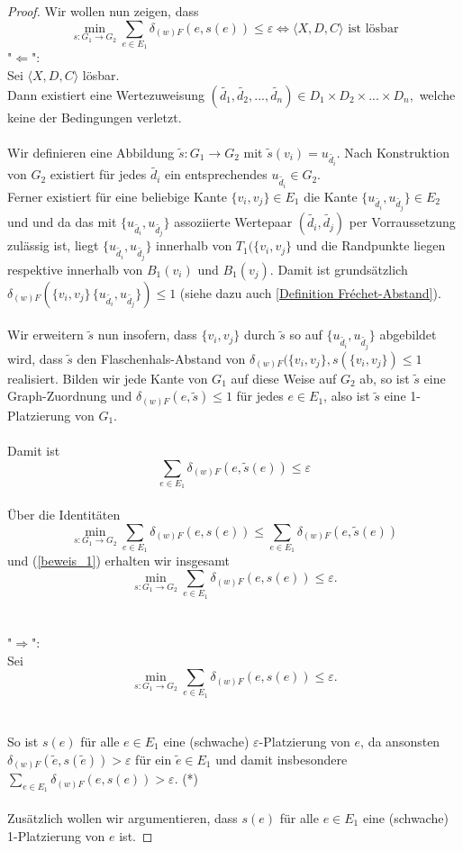 \documentclass[a4paper, 12pt, twoside]{article}
\theoremstyle{Format1} %
\begin{document}
\begin{proof}
Wir wollen nun zeigen, dass
$$ \min_{s: G_1 \to G_2} \sum_{e \in E_1} \delta_{(w)F}(e, s(e)) \leq \varepsilon \iff \langle X,D,C \rangle \text{ ist lösbar}$$
"$\Leftarrow$":
\\
Sei $\langle X,D,C \rangle$ lösbar.
\\
Dann existiert eine Wertezuweisung $(\tilde{d_1},\tilde{d_2},...,\tilde{d_n}) \in {D_1 \times D_2 \times ... \times D_n},$ welche keine der Bedingungen verletzt.
\\
\\
Wir definieren eine Abbildung $\tilde{s}:G_1 \to G_2$ mit $\tilde{s}(v_i) = u_{\tilde{d_i}}$.
Nach Konstruktion von $G_2$ existiert für jedes $\tilde{d_i}$ ein entsprechendes $u_{\tilde{d_i}} \in G_2$.
\\
Ferner existiert für eine beliebige Kante $\{v_i, v_j\} \in E_1$ die Kante $\{u_{\tilde{d_i}}, u_{\tilde{d_j}}\} \in E_2$ und
und da das mit $\{u_{\tilde{d_i}}, u_{\tilde{d_j}}\}$ assoziierte Wertepaar $(\tilde{d_i},\tilde{d_j})$ per Vorraussetzung zulässig ist,
liegt $\{u_{\tilde{d_i}}, u_{\tilde{d_j}}\}$ innerhalb von $T_1(\{v_i, v_j\}$ und die Randpunkte liegen respektive innerhalb von $B_1(v_i)$ und $B_1(v_j)$.
Damit ist grundsätzlich $\delta_{(w)F}(\{v_i, v_j\}\,\{u_{\tilde{d_i}}, u_{\tilde{d_j}}\}) \leq 1$ (siehe dazu auch \ref{Definition Fréchet-Abstand}).
\\
\\
Wir erweitern $\tilde{s}$ nun insofern, dass $\{v_i, v_j\}$ durch $\tilde{s}$ so auf $\{u_{\tilde{d_i}}, u_{\tilde{d_j}}\}$ abgebildet wird,
dass $\tilde{s}$ den Flaschenhals-Abstand von $\delta_{(w)F}(\{v_i, v_j\}, s(\{v_i, v_j\}) \leq 1$ realisiert.
Bilden wir jede Kante von $G_1$ auf diese Weise auf $G_2$ ab, so ist $\tilde{s}$ eine Graph-Zuordnung und $\delta_{(w)F}(e, \tilde{s}) \leq 1$ für jedes $e \in E_1$,
also ist $\tilde{s}$ eine 1-Platzierung von $G_1$.
\\
\\
Damit ist
\begin{equation} \label{beweis_1}
	\sum_{e \in E_1} \delta_{(w)F}(e, \tilde{s}(e)) \leq \varepsilon
\end{equation}
\\
Über die Identitäten $$\min_{s: G_1 \to G_2} \sum_{e \in E_1} \delta_{(w)F}(e, s(e)) \leq \sum_{e \in E_1} \delta_{(w)F}(e,\tilde{s}(e)) $$
und (\ref{beweis_1}) erhalten wir insgesamt
$$\min_{s: G_1 \to G_2} \sum_{e \in E_1} \delta_{(w)F}(e, s(e)) \leq \varepsilon .$$
\\
\\
"$\Rightarrow$":
\\
Sei $$\min_{s: G_1 \to G_2} \sum_{e \in E_1} \delta_{(w)F}(e, s(e)) \leq {\varepsilon}.$$
\\
\\
So ist $s(e)$ für alle $e \in E_1$ eine (schwache) $\varepsilon$-Platzierung von $e$,
da ansonsten $\delta_{(w)F}(\tilde{e}, s(\tilde{e})) > \varepsilon$ für ein $\tilde{e} \in E_1$ und damit insbesondere $\sum_{{e}\in E_1} \delta_{(w)F}(e, s(e)) > \varepsilon$.
(*)
\\
\\
Zusätzlich wollen wir argumentieren, dass $s(e)$ für alle $e \in E_1$ eine (schwache) 1-Platzierung von $e$ ist.


\end{proof}
\end{document}
